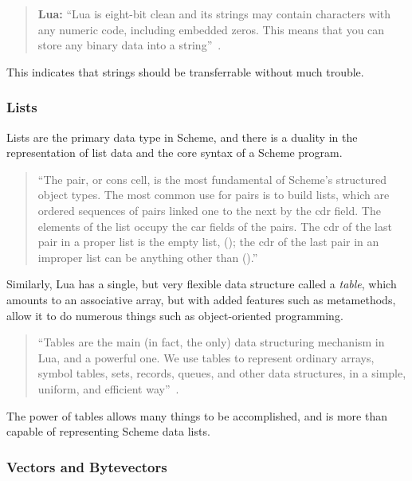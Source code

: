 \begin{quotation}\textbf{Lua:}
``Lua is eight-bit clean and its strings may contain characters with any numeric
code, including embedded zeros. This means that you can store any binary data
into a string''~\cite[p.11]{luabook}.
\end{quotation}

This indicates that strings should be transferrable without much trouble.

\subsubsection{Lists}

Lists are the primary data type in Scheme, and there is a duality in the
representation of list data and the core syntax of a Scheme program.

\begin{quotation}
``The pair, or cons cell, is the most fundamental of Scheme's structured object
types. The most common use for pairs is to build lists, which are ordered
sequences of pairs linked one to the next by the cdr field. The elements of the
list occupy the car fields of the pairs. The cdr of the last pair in a proper
list is the empty list, (); the cdr of the last pair in an improper list can be
anything other than ().''~\cite[Sec~6.4]{tspl}
\end{quotation}


Similarly, Lua has a single, but very flexible data structure called a
\emph{table}, which amounts to an associative array, but with added features
such as metamethods, allow it to do numerous things such as object-oriented
programming.
\begin{quotation}
``Tables are the main (in fact, the only) data structuring mechanism in Lua, and
a powerful one. We use tables to represent ordinary arrays, symbol tables, sets,
records, queues, and other data structures, in a simple, uniform, and efficient
way''~\cite[p.14]{luabook}.
\end{quotation}

The power of tables allows many things to be accomplished, and is more than
capable of representing Scheme data lists.


\subsubsection{Vectors and Bytevectors}

